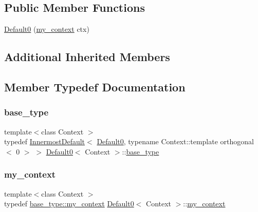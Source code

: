 \subsection*{Public Member Functions}
\begin{DoxyCompactItemize}
\item 
\mbox{\hyperlink{struct_default0_ab2ba7bbdcc04e41a362c2e87e7a66b6f}{Default0}} (\mbox{\hyperlink{struct_default0_abe729d763308952bd5df854e44ea8b81}{my\+\_\+context}} ctx)
\end{DoxyCompactItemize}
\subsection*{Additional Inherited Members}


\subsection{Member Typedef Documentation}
\mbox{\label{struct_default0_a26b2b54fc496946980faa6e3736c68aa}} 
\subsubsection{\texorpdfstring{base\+\_\+type}{base\_type}}
{\footnotesize\ttfamily template$<$class Context $>$ \\
typedef \mbox{\hyperlink{struct_innermost_default}{Innermost\+Default}}$<$ \mbox{\hyperlink{struct_default0}{Default0}}, typename Context\+::template orthogonal$<$ 0 $>$ $>$ \mbox{\hyperlink{struct_default0}{Default0}}$<$ Context $>$\+::\mbox{\hyperlink{struct_default0_a26b2b54fc496946980faa6e3736c68aa}{base\+\_\+type}}}

\mbox{\label{struct_default0_abe729d763308952bd5df854e44ea8b81}} 
\subsubsection{\texorpdfstring{my\+\_\+context}{my\_context}}
{\footnotesize\ttfamily template$<$class Context $>$ \\
typedef \mbox{\hyperlink{struct_innermost_default_a0aab337364dec3101e80f293b709d53d}{base\+\_\+type\+::my\+\_\+context}} \mbox{\hyperlink{struct_default0}{Default0}}$<$ Context $>$\+::\mbox{\hyperlink{struct_default0_abe729d763308952bd5df854e44ea8b81}{my\+\_\+context}}}



